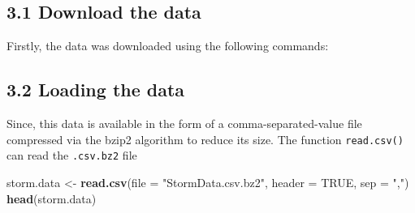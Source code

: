 \documentclass[]{article}
\newenvironment{Shaded}{\begin{snugshade}}{\end{snugshade}}
\newcommand{\KeywordTok}[1]{\textcolor[rgb]{0.13,0.29,0.53}{\textbf{#1}}}
\newcommand{\DataTypeTok}[1]{\textcolor[rgb]{0.13,0.29,0.53}{#1}}
\newcommand{\StringTok}[1]{\textcolor[rgb]{0.31,0.60,0.02}{#1}}
\newcommand{\OtherTok}[1]{\textcolor[rgb]{0.56,0.35,0.01}{#1}}
\newcommand{\ControlFlowTok}[1]{\textcolor[rgb]{0.13,0.29,0.53}{\textbf{#1}}}
\newcommand{\OperatorTok}[1]{\textcolor[rgb]{0.81,0.36,0.00}{\textbf{#1}}}
\newcommand{\NormalTok}[1]{#1}
\begin{document}
\subsection{3.1 Download the data}\label{download-the-data}

Firstly, the data was downloaded using the following commands:

\begin{Shaded}
\end{Shaded}

\subsection{3.2 Loading the data}\label{loading-the-data}

Since, this data is available in the form of a comma-separated-value
file compressed via the bzip2 algorithm to reduce its size. The function
\texttt{read.csv()} can read the \texttt{.csv.bz2} file

\begin{Shaded}
\begin{Highlighting}[]
\NormalTok{storm.data <-}\StringTok{ }\KeywordTok{read.csv}\NormalTok{(}\DataTypeTok{file =} \StringTok{"StormData.csv.bz2"}\NormalTok{, }\DataTypeTok{header =} \OtherTok{TRUE}\NormalTok{, }\DataTypeTok{sep =} \StringTok{","}\NormalTok{)}
\KeywordTok{head}\NormalTok{(storm.data)}
\end{Highlighting}
\end{Shaded}
\end{document}
